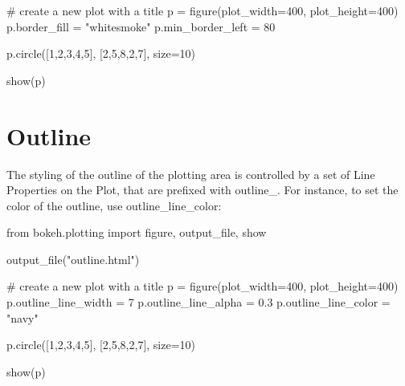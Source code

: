 # create a new plot with a title
p = figure(plot_width=400, plot_height=400)
p.border_fill = "whitesmoke"
p.min_border_left = 80

p.circle([1,2,3,4,5], [2,5,8,2,7], size=10)

show(p)
	
\section{Outline}
The styling of the outline of the plotting area is controlled by a set of Line Properties on the Plot, that are prefixed with outline_. For instance, to set the color of the outline, use outline_line_color:

from bokeh.plotting import figure, output_file, show

output_file("outline.html")

# create a new plot with a title
p = figure(plot_width=400, plot_height=400)
p.outline_line_width = 7
p.outline_line_alpha = 0.3
p.outline_line_color = "navy"

p.circle([1,2,3,4,5], [2,5,8,2,7], size=10)

show(p)
	
